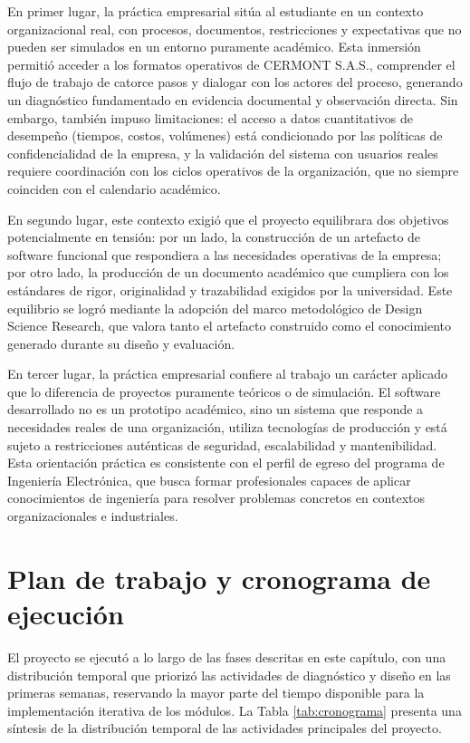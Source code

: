 En primer lugar, la práctica empresarial sitúa al estudiante en un contexto organizacional real, con procesos, documentos, restricciones y expectativas que no pueden ser simulados en un entorno puramente académico. Esta inmersión permitió acceder a los formatos operativos de CERMONT S.A.S., comprender el flujo de trabajo de catorce pasos y dialogar con los actores del proceso, generando un diagnóstico fundamentado en evidencia documental y observación directa. Sin embargo, también impuso limitaciones: el acceso a datos cuantitativos de desempeño (tiempos, costos, volúmenes) está condicionado por las políticas de confidencialidad de la empresa, y la validación del sistema con usuarios reales requiere coordinación con los ciclos operativos de la organización, que no siempre coinciden con el calendario académico.

En segundo lugar, este contexto exigió que el proyecto equilibrara dos objetivos potencialmente en tensión: por un lado, la construcción de un artefacto de software funcional que respondiera a las necesidades operativas de la empresa; por otro lado, la producción de un documento académico que cumpliera con los estándares de rigor, originalidad y trazabilidad exigidos por la universidad. Este equilibrio se logró mediante la adopción del marco metodológico de Design Science Research, que valora tanto el artefacto construido como el conocimiento generado durante su diseño y evaluación.

En tercer lugar, la práctica empresarial confiere al trabajo un carácter aplicado que lo diferencia de proyectos puramente teóricos o de simulación. El software desarrollado no es un prototipo académico, sino un sistema que responde a necesidades reales de una organización, utiliza tecnologías de producción y está sujeto a restricciones auténticas de seguridad, escalabilidad y mantenibilidad. Esta orientación práctica es consistente con el perfil de egreso del programa de Ingeniería Electrónica, que busca formar profesionales capaces de aplicar conocimientos de ingeniería para resolver problemas concretos en contextos organizacionales e industriales.

\section{Plan de trabajo y cronograma de ejecución}
\label{sec:cronograma}

El proyecto se ejecutó a lo largo de las fases descritas en este capítulo, con una distribución temporal que priorizó las actividades de diagnóstico y diseño en las primeras semanas, reservando la mayor parte del tiempo disponible para la implementación iterativa de los módulos. La Tabla \ref{tab:cronograma} presenta una síntesis de la distribución temporal de las actividades principales del proyecto.

